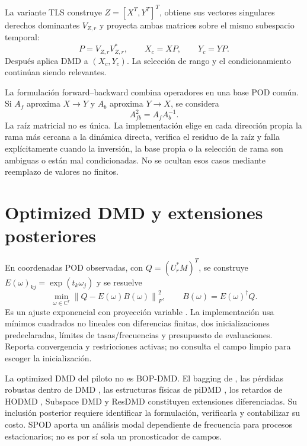 \documentclass[11pt,oneside,openany]{book}
\newcommand{\norm}[1]{\left\lVert #1\right\rVert}
\newcommand{\C}{\mathbb{C}}
\begin{document}
La variante TLS construye $Z=[X^T,Y^T]^T$, obtiene sus vectores singulares
derechos dominantes $V_{Z,r}$ y proyecta ambas matrices sobre el mismo
subespacio temporal:
\begin{equation}
 P=V_{Z,r}V_{Z,r}^*,\qquad X_c=XP,\qquad Y_c=YP.
\end{equation}
Después aplica DMD a $(X_c,Y_c)$. La selección de rango y el
condicionamiento continúan siendo relevantes.

La formulación forward--backward combina operadores en una base POD común.
Si $A_f$ aproxima $X\to Y$ y $A_b$ aproxima $Y\to X$, se considera
\begin{equation}
 A_{fb}^2=A_fA_b^{-1}.
\end{equation}
La raíz matricial no es única. La implementación elige en cada dirección
propia la rama más cercana a la dinámica directa, verifica el residuo de la
raíz y falla explícitamente cuando la inversión, la base propia o la
selección de rama son ambiguas o están mal condicionadas. No se ocultan
esos casos mediante reemplazo de valores no finitos.

\section{Optimized DMD y extensiones posteriores}
En coordenadas POD observadas, con $Q=(U_r^*M)^T$, se construye
$E(\omega)_{kj}=\exp(t_k\omega_j)$ y se resuelve
\begin{equation}
 \min_{\omega\in\C^r}\norm{Q-E(\omega)B(\omega)}_F^2,
 \qquad B(\omega)=E(\omega)^\dagger Q.
 \label{eq:optdmd}
\end{equation}
Es un ajuste exponencial con proyección variable
\citep{askham2018optimized}. La implementación usa mínimos cuadrados no
lineales con diferencias finitas, dos inicializaciones predeclaradas,
límites de tasas/frecuencias y presupuesto de evaluaciones. Reporta
convergencia y restricciones activas; no consulta el campo limpio para
escoger la inicialización.

La optimized DMD del piloto no es BOP-DMD. El bagging de
\citet{sashidhar2022bagging}, las pérdidas robustas dentro de DMD
\citep{askham2022robust}, las estructuras físicas de piDMD
\citep{baddoo2023physics}, los retardos de HODMD
\citep{leclainche2017hodmd}, Subspace DMD
\citep{takeishi2017subspace} y ResDMD
\citep{colbrook2023resdmd} constituyen extensiones diferenciadas.
Su inclusión posterior requiere identificar la formulación, verificarla y
contabilizar su costo. SPOD \citep{towne2018spod} aporta un análisis modal
dependiente de frecuencia para procesos estacionarios; no es por sí sola
un pronosticador de campos.
\end{document}
